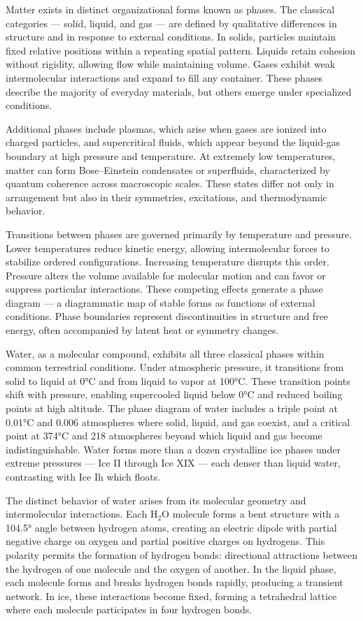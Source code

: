 Matter exists in distinct organizational forms known as phases. The classical categories — solid, liquid, and gas — are defined by qualitative differences in structure and in response to external conditions. In solids, particles maintain fixed relative positions within a repeating spatial pattern. Liquids retain cohesion without rigidity, allowing flow while maintaining volume. Gases exhibit weak intermolecular interactions and expand to fill any container. These phases describe the majority of everyday materials, but others emerge under specialized conditions.

Additional phases include plasmas, which arise when gases are ionized into charged particles, and supercritical fluids, which appear beyond the liquid-gas boundary at high pressure and temperature. At extremely low temperatures, matter can form Bose–Einstein condensates or superfluids, characterized by quantum coherence across macroscopic scales. These states differ not only in arrangement but also in their symmetries, excitations, and thermodynamic behavior.

Transitions between phases are governed primarily by temperature and pressure. Lower temperatures reduce kinetic energy, allowing intermolecular forces to stabilize ordered configurations. Increasing temperature disrupts this order. Pressure alters the volume available for molecular motion and can favor or suppress particular interactions. These competing effects generate a phase diagram — a diagrammatic map of stable forms as functions of external conditions. Phase boundaries represent discontinuities in structure and free energy, often accompanied by latent heat or symmetry changes.

Water, as a molecular compound, exhibits all three classical phases within common terrestrial conditions. Under atmospheric pressure, it transitions from solid to liquid at 0°C and from liquid to vapor at 100°C. These transition points shift with pressure, enabling supercooled liquid below 0°C and reduced boiling points at high altitude. The phase diagram of water includes a triple point at 0.01°C and 0.006 atmospheres where solid, liquid, and gas coexist, and a critical point at 374°C and 218 atmospheres beyond which liquid and gas become indistinguishable. Water forms more than a dozen crystalline ice phases under extreme pressures — Ice II through Ice XIX — each denser than liquid water, contrasting with Ice Ih which floats.

The distinct behavior of water arises from its molecular geometry and intermolecular interactions. Each H\(_2\)O molecule forms a bent structure with a 104.5° angle between hydrogen atoms, creating an electric dipole with partial negative charge on oxygen and partial positive charges on hydrogens. This polarity permits the formation of hydrogen bonds: directional attractions between the hydrogen of one molecule and the oxygen of another. In the liquid phase, each molecule forms and breaks hydrogen bonds rapidly, producing a transient network. In ice, these interactions become fixed, forming a tetrahedral lattice where each molecule participates in four hydrogen bonds.

